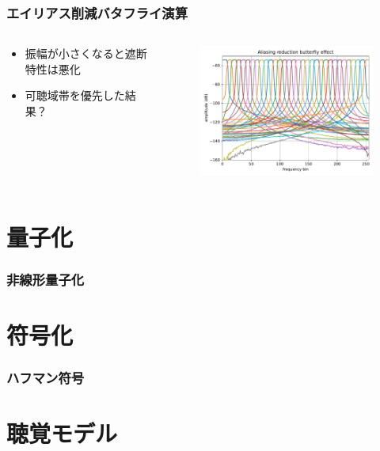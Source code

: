 \documentclass[14pt,xcolor=dvipsnames,table,dvipdfmx]{beamer}
\begin{document}
\begin{frame}[c]
    \frametitle{エイリアス削減バタフライ演算}
    \begin{columns}
        \begin{column}{0.35\textwidth}
            \begin{itemize}
                \item 振幅が小さくなると遮断特性は悪化
                \item 可聴域帯を優先した結果？
            \end{itemize}
        \end{column}
        \begin{column}{0.7\textwidth}
            \begin{figure}
                \includegraphics[width=85mm]{./figs/MP3_aliasing_reduction_butterfly_butterfly.pdf}
            \end{figure}
        \end{column}
    \end{columns}
\end{frame}

\section{量子化}

\begin{frame}[c]
    \frametitle{非線形量子化}
\end{frame}

\section{符号化}

\begin{frame}[c]
    \frametitle{ハフマン符号}
\end{frame}

\section{聴覚モデル}
\end{document}
